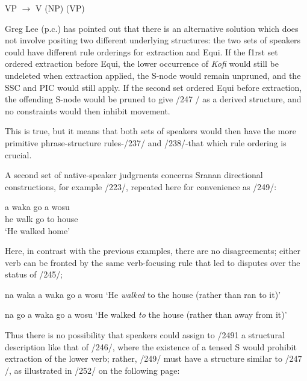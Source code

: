 \ea\label{ex:2:248}
 VP {$\to$} V (NP) (VP)
\z

Greg Lee (p.c.) has pointed out that there is an alternative solution which does not involve positing two different underlying structures: the two sets of speakers could have different rule orderings for extraction and Equi. If the f1rst set ordered extraction before Equi, the lower occurrence of \textit{Kofi} would still be undeleted when extraction applied, the S-node would remain unpruned, and the SSC and PIC would still apply. If the second set ordered Equi before ex\-traction, the offending S-node would be pruned to give /247 / as a derived structure, and no constraints would then inhibit movement.

This is true, but it means that both sets of speakers would then
have the more primitive phrase-structure rules-/237/ and /238/-that
which rule ordering is crucial.

A second set of native-speaker judgrnents concerns Sranan directional constructions, for example /223/, repeated here for conveni\-ence as /249/:

\ea\label{ex:2:249}
\gll  a waka go a wosu\\
he walk go to house \\
\glt `He walked home'
\z

 

Here, in contrast with the previous examples, there are no disagree\-ments; either verb can be fronted by the same verb-focusing rule that led to disputes over the status of /245/;

\ea\label{ex:2:250}
 na waka a waka go a wosu
\glt `He \textit{walked} to the house (rather than ran to it)'
\z



\ea\label{ex:2:251}
 na go a waka go a wosu
\glt `He walked \textit{to} the house (rather than away from it)'
\z



Thus there is no possibility that speakers could assign to /2491 a struc\-tural description like that of /246/, where the existence of a tensed S would prohibit extraction of the lower verb; rather, /249/ must have a structure similar to /247 /, as illustrated in /252/ on the following page:


